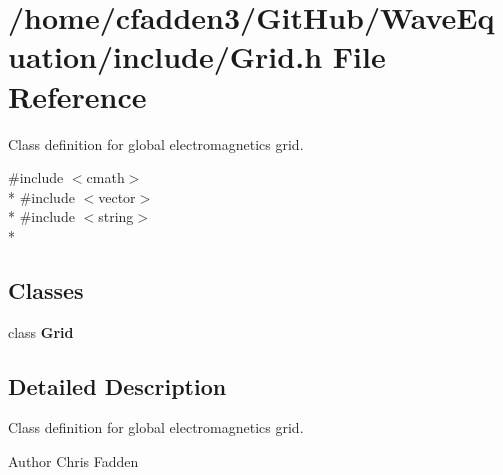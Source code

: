 \section{/home/cfadden3/\+Git\+Hub/\+Wave\+Equation/include/\+Grid.h File Reference}
\label{_grid_8h}


Class definition for global electromagnetics grid.  


{\ttfamily \#include $<$cmath$>$}\\*
{\ttfamily \#include $<$vector$>$}\\*
{\ttfamily \#include $<$string$>$}\\*
\subsection*{Classes}
\begin{DoxyCompactItemize}
\item 
class {\bf Grid}
\end{DoxyCompactItemize}


\subsection{Detailed Description}
Class definition for global electromagnetics grid. 

\begin{DoxyAuthor}{Author}
Chris Fadden 
\end{DoxyAuthor}
